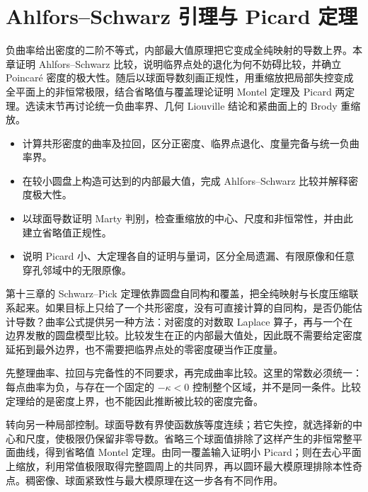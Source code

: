 \chapter{Ahlfors–Schwarz 引理与 Picard 定理}
\label{b3:ch:14}
\begin{chapterabstract}
负曲率给出密度的二阶不等式，内部最大值原理把它变成全纯映射的导数上界。本章证明 Ahlfors--Schwarz 比较，说明临界点处的退化为何不妨碍比较，并确立 Poincaré 密度的极大性。随后以球面导数刻画正规性，用重缩放把局部失控变成全平面上的非恒常极限，结合省略值与覆盖理论证明 Montel 定理及 Picard 两定理。选读末节再讨论统一负曲率界、几何 Liouville 结论和紧曲面上的 Brody 重缩放。
\end{chapterabstract}

\begin{learninggoals}
\begin{itemize}
\item\label{b3:item:14-goal-1}计算共形密度的曲率及拉回，区分正密度、临界点退化、度量完备与统一负曲率界。
\item\label{b3:item:14-goal-2}在较小圆盘上构造可达到的内部最大值，完成 Ahlfors--Schwarz 比较并解释密度极大性。
\item\label{b3:item:14-goal-3}以球面导数证明 Marty 判别，检查重缩放的中心、尺度和非恒常性，并由此建立省略值正规性。
\item\label{b3:item:14-goal-4}说明 Picard 小、大定理各自的证明与量词，区分全局遗漏、有限原像和任意穿孔邻域中的无限原像。
\end{itemize}
\end{learninggoals}

第十三章的 Schwarz--Pick 定理依靠圆盘自同构和覆盖，把全纯映射与长度压缩联系起来。如果目标上只给了一个共形密度，没有可直接计算的自同构，是否仍能估计导数？曲率公式提供另一种方法：对密度的对数取 Laplace 算子，再与一个在边界发散的圆盘模型比较。比较发生在正的内部最大值处，因此既不需要给定密度延拓到最外边界，也不需要把临界点处的零密度硬当作正度量。

\ProseParagraphBreak
{}先整理曲率、拉回与完备性的不同要求，再完成曲率比较。这里的常数必须统一：每点曲率为负，与存在一个固定的 \(-\kappa<0\) 控制整个区域，并不是同一条件。比较定理给的是密度上界，也不能因此推断被比较的密度完备。

\ProseParagraphBreak
{}转向另一种局部控制。球面导数有界使函数族等度连续；若它失控，就选择新的中心和尺度，使极限仍保留非零导数。省略三个球面值排除了这样产生的非恒常整平面曲线，得到省略值 Montel 定理。由同一覆盖输入证明小 Picard；则在去心平面上缩放，利用常值极限取得完整圆周上的共同界，再以圆环最大模原理排除本性奇点。稠密像、球面紧致性与最大模原理在这一步各有不同作用。

